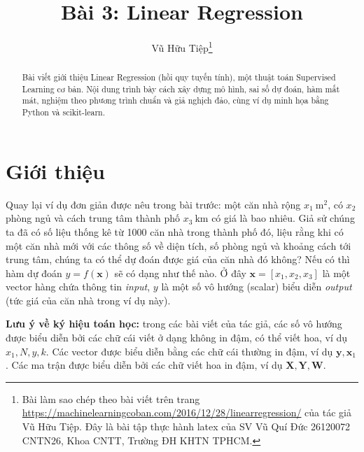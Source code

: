 \documentclass[runningheads]{llncs}
\begin{document}
\title{Bài 3: Linear Regression}
\author{Vũ Hữu Tiệp\thanks{Bài làm sao chép theo bài viết trên trang
\url{https://machinelearningcoban.com/2016/12/28/linearregression/}
của tác giả Vũ Hữu Tiệp. Đây là bài tập thực hành latex của SV
Vũ Quí Đức 26120072 CNTN26, Khoa CNTT, Trường ĐH KHTN TPHCM.}}

\makeatletter
\let\originaladdcontentsline\addcontentsline
\renewcommand{\addcontentsline}[3]{%
  \def\@tempa{#2}%
  \def\@tempb{title}%
  \ifx\@tempa\@tempb
  \else
    \def\@tempb{author}%
    \ifx\@tempa\@tempb
    \else
      \originaladdcontentsline{#1}{#2}{#3}%
    \fi
  \fi
}
\maketitle
\let\addcontentsline\originaladdcontentsline
\makeatother

\begin{abstract}
Bài viết giới thiệu Linear Regression (hồi quy tuyến tính), một thuật toán
Supervised Learning cơ bản. Nội dung trình bày cách xây dựng mô hình, sai số
dự đoán, hàm mất mát, nghiệm theo phương trình chuẩn và giả nghịch đảo, cùng
ví dụ minh họa bằng Python và scikit-learn.
\end{abstract}

\clearpage
\tableofcontents
\clearpage

\section{Giới thiệu}

Quay lại ví dụ đơn giản được nêu trong bài trước: một căn nhà rộng
$x_1~\text{m}^2$, có $x_2$ phòng ngủ và cách trung tâm thành phố
$x_3~\text{km}$ có giá là bao nhiêu. Giả sử chúng ta đã có số liệu thống kê
từ 1000 căn nhà trong thành phố đó, liệu rằng khi có một căn nhà mới với các
thông số về diện tích, số phòng ngủ và khoảng cách tới trung tâm, chúng ta có
thể dự đoán được giá của căn nhà đó không? Nếu có thì hàm dự đoán
$y = f(\mathbf{x})$ sẽ có dạng như thế nào. Ở đây
$\mathbf{x} = [x_1, x_2, x_3]$ là một vector hàng chứa thông tin \emph{input},
$y$ là một số vô hướng (scalar) biểu diễn \emph{output} (tức giá của căn nhà
trong ví dụ này).

\textbf{Lưu ý về ký hiệu toán học:} trong các bài viết của tác giả, các số vô
hướng được biểu diễn bởi các chữ cái viết ở dạng không in đậm, có thể viết
hoa, ví dụ $x_1, N, y, k$. Các vector được biểu diễn bằng các chữ cái thường
in đậm, ví dụ $\mathbf{y}, \mathbf{x}_1$. Các ma trận được biểu diễn bởi các
chữ viết hoa in đậm, ví dụ $\mathbf{X}, \mathbf{Y}, \mathbf{W}$.
\end{document}
